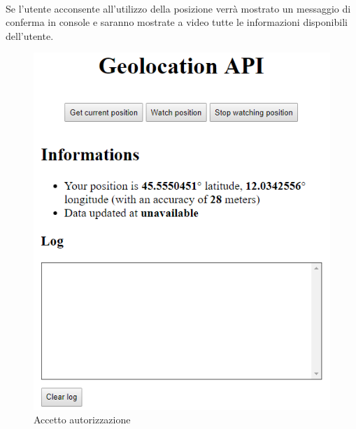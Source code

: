 \documentclass[11pt ,a4paper , twoside , openright ]{article}
\begin{document}
\pagebreak
\\
Se l'utente acconsente all'utilizzo della posizione verrà mostrato un messaggio di conferma in console e saranno mostrate a video tutte le informazioni disponibili dell'utente.
\begin{figure}[h]
	\centering
	\includegraphics[width=0.4\linewidth]{geo4}
	\caption{Accetto autorizzazione}
	\label{fig: Accetto autorizzazione}
\end{figure}
\\
\end{document}
